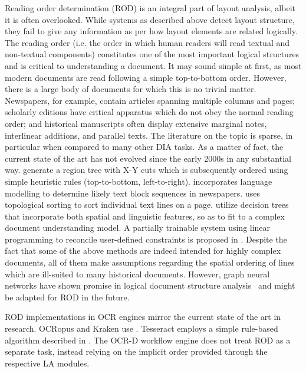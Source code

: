Reading order determination (ROD) is an integral part of layout analysis,
albeit it is often overlooked. While systems as described above detect layout
structure, they fail to give any information as per how layout elements are
related logically.  The reading order (i.e. the order in which human readers
will read textual and non-textual components) constitutes one of the most
important logical structures and is critical to understanding a document. It
may sound simple at first, as most modern documents are read following a simple
top-to-bottom order. However, there is a large body of documents for which this
is no trivial matter. Newspapers, for example, contain articles spanning
multiple columns and pages; scholarly editions have critical apparatus which do
not obey the normal reading order; and historical manuscripts often display
extensive marginal notes, interlinear additions, and parallel texts. The
literature on the topic is sparse, in particular when compared to many other
DIA tasks. As a matter of fact, the current state of the art has not evolved
since the early 2000s in any substantial way. \cite{nagy1984hierarchical,ishitani2003document,meunier2005optimized} generate
a region tree with X-Y cuts which is subsequently ordered using simple
heuristic rules (top-to-bottom, left-to-right). \cite{Gao} incorporates
language modelling to determine likely text block sequences in newspapers.
\cite{Breuel03highperformance} uses topological sorting to sort individual text
lines on a page. \cite{AielloIJDAR2002} utilize decision trees that incorporate
both spatial and linguistic features, so as to fit to a complex document
understanding model. A partially trainable system using linear programming to
reconcile user-defined constraints is proposed in \cite{malerba2008machine}.
Despite the fact that some of the above methods are indeed intended for highly
complex documents, all of them make assumptions regarding the spatial ordering
of lines which are ill-suited to many historical documents. However, graph
neural networks have shown promise in logical document structure
analysis~\cite{dejean2019versatile} and might be adapted for ROD in the future.

ROD implementations in OCR engines mirror the current state of the art in
research. OCRopus and Kraken use \cite{Breuel03highperformance}. Tesseract
employs a simple rule-based algorithm described in \cite{5277715}. The OCR-D
workflow engine does not treat ROD as a separate task, instead relying on the
implicit order provided through the respective LA modules.

